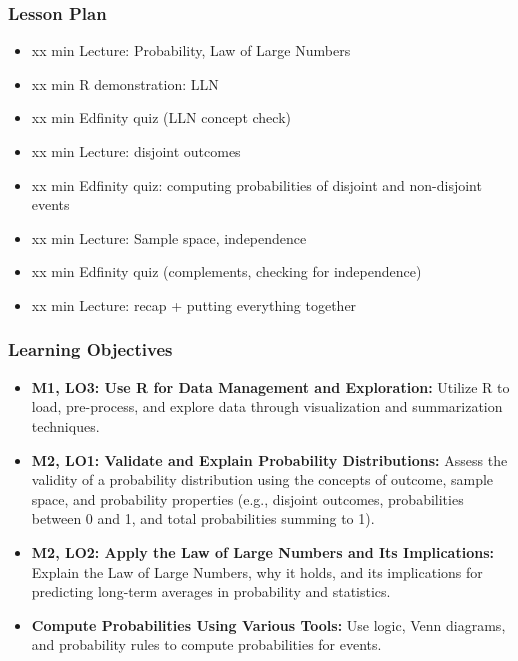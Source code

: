 \begin{frame}
    \frametitle{Lesson Plan}
    \begin{itemize}
        \item xx min Lecture: Probability, Law of Large Numbers
        \item xx min R demonstration: LLN
        \item xx min Edfinity quiz (LLN concept check)
        \item xx min Lecture: disjoint outcomes
        \item xx min Edfinity quiz: computing probabilities of disjoint and non-disjoint events
        \item xx min Lecture: Sample space, independence
        \item xx min Edfinity quiz (complements, checking for independence)
        \item xx min Lecture: recap + putting everything together
    \end{itemize}
\end{frame}

\begin{frame}
    \frametitle{Learning Objectives}
    \begin{itemize}
        \item \textbf{M1, LO3: Use R for Data Management and Exploration:} Utilize R to load, pre-process, and explore data through visualization and summarization techniques.
        \item \textbf{M2, LO1: Validate and Explain Probability Distributions:} Assess the validity of a probability distribution using the concepts of outcome, sample space, and probability properties (e.g., disjoint outcomes, probabilities between 0 and 1, and total probabilities summing to 1).
        \item \textbf{M2, LO2: Apply the Law of Large Numbers and Its Implications:} Explain the Law of Large Numbers, why it holds, and its implications for predicting long-term averages in probability and statistics.
        \item \textbf{Compute Probabilities Using Various Tools:} Use logic, Venn diagrams, and probability rules to compute probabilities for events.
    \end{itemize}
\end{frame}

